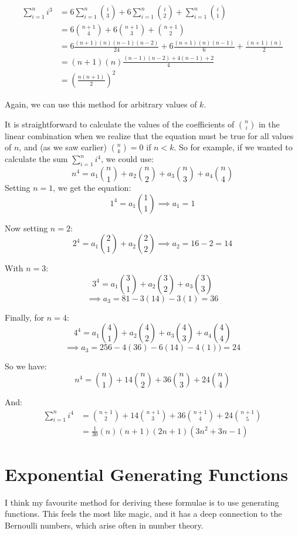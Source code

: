 \documentclass{article}
\begin{document}
\begin{align*}
	\sum_{i=1}^{n} i^3 &= 6\sum_{i=1}^{n} \binom{i}{3} + 6\sum_{i=1}^{n} \binom{i}{2}
	+ \sum_{i=1}^{n} \binom{i}{1} \\
	&= 6\binom{n+1}{4} +6\binom{n+1}{3} + \binom{n+1}{2} \\
	&= 6\frac{(n+1)(n)(n-1)(n-2)}{24} +6 \frac{(n+1)(n)(n-1)}{6} + \frac{(n+1)(n)}{2} \\
	&= (n+1)(n) \frac{(n-1)(n-2) + 4(n-1) + 2}{4} \\
	&= \left(\frac{n(n+1)}{2}\right)^2
\end{align*}

Again, we can use this method for arbitrary values of $k$.

It is straightforward to calculate the values of the coefficients of $\binom{n}{i}$ in
the linear combination when we realize that the equation must be true for all values of
$n$, and (as we saw earlier) $\binom{n}{k} = 0$ if $n<k$. So for example, if we wanted to 
calculate the sum $\sum_{i=1}^{n} i^4$, we could use:
\[ n^4 = a_1\binom{n}{1} + a_2\binom{n}{2} + a_3 \binom{n}{3} + a_4 \binom{n}{4} \]
Setting $n=1$, we get the equation:
\[ 1^4 = a_1\binom{1}{1} \implies a_1 = 1 \]

Now setting $n=2$:
\[ 2^4 = a_1\binom{2}{1} + a_2\binom{2}{2} \implies a_2 = 16-2 = 14 \]

With $n=3$:
\[ 3^4 = a_1\binom{3}{1} + a_2\binom{3}{2} + a_3\binom{3}{3}\]
\[\implies a_3 = 81 -3(14) - 3(1)  = 36 \]

Finally, for $n=4$:
\[ 4^4 = a_1\binom{4}{1} + a_2\binom{4}{2} + a_3\binom{4}{3} + a_4\binom{4}{4}\]
\[\implies a_3 = 256 -4(36) - 6(14) - 4(1))  = 24\]

So we have:
\[ n^4 = \binom{n}{1} + 14\binom{n}{2} + 36 \binom{n}{3} + 24 \binom{n}{4} \]

And:
\begin{align*}
	\sum_{i=1}^{n} i^4 &= \binom{n+1}{2} + 14\binom{n+1}{3} + 36 \binom{n+1}{4}
	                      + 24 \binom{n+1}{5} \\
			   &= \frac{1}{30} (n)(n + 1)(2n + 1)(3n^2 +3n - 1)
\end{align*}

\section{Exponential Generating Functions}

I think my favourite method for deriving these formulae is to use generating functions.
This feels the most like magic, and it has a deep connection to the Bernoulli numbers,
which arise often in number theory.
\end{document}
